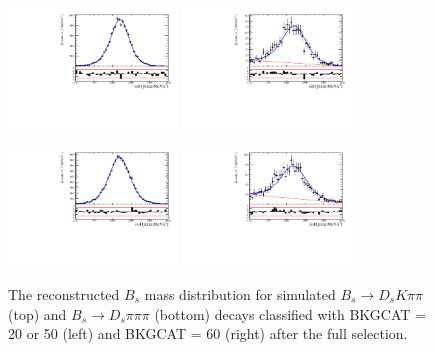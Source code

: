 \begin{figure}[h]
\centering
\includegraphics[height=!,width=0.4\textwidth]{figs/MassFit/signalMC_pull.pdf}
\includegraphics[height=!,width=0.4\textwidth]{figs/MassFit/signalMC_ghost_pull.pdf}

\includegraphics[height=!,width=0.4\textwidth]{figs/MassFit/normMC_pull.pdf}
\includegraphics[height=!,width=0.4\textwidth]{figs/MassFit/normMC_ghost_pull.pdf}

\caption{The reconstructed $B_s$ mass distribution for simulated $B_s \to D_s K \pi \pi$ (top) and $B_s \to D_s \pi \pi \pi$ (bottom) decays 
classified with \textsf{BKGCAT} = 20 or 50 (left) and \textsf{BKGCAT} = 60 (right) after the full selection. }
\label{fig:}
\end{figure}

